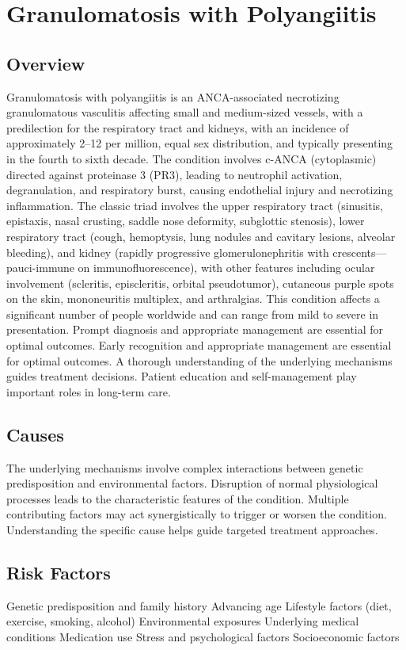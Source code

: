 \chapter{Granulomatosis with Polyangiitis}
\label{sec:Granulomatosis with Polyangiitis (GPA)}

\section{Overview}
Granulomatosis with polyangiitis is an ANCA-associated necrotizing granulomatous vasculitis affecting small and medium-sized vessels, with a predilection for the respiratory tract and kidneys, with an incidence of approximately 2--12 per million, equal sex distribution, and typically presenting in the fourth to sixth decade. The condition involves c-ANCA (cytoplasmic) directed against proteinase 3 (PR3), leading to neutrophil activation, degranulation, and respiratory burst, causing endothelial injury and necrotizing inflammation. The classic triad involves the upper respiratory tract (sinusitis, epistaxis, nasal crusting, saddle nose deformity, subglottic stenosis), lower respiratory tract (cough, hemoptysis, lung nodules and cavitary lesions, alveolar bleeding), and kidney (rapidly progressive glomerulonephritis with crescents---pauci-immune on immunofluorescence), with other features including ocular involvement (scleritis, episcleritis, orbital pseudotumor), cutaneous purple spots on the skin, mononeuritis multiplex, and arthralgias. This condition affects a significant number of people worldwide and can range from mild to severe in presentation. Prompt diagnosis and appropriate management are essential for optimal outcomes. Early recognition and appropriate management are essential for optimal outcomes. A thorough understanding of the underlying mechanisms guides treatment decisions. Patient education and self-management play important roles in long-term care.
\section{Causes}
The underlying mechanisms involve complex interactions between genetic predisposition and environmental factors. Disruption of normal physiological processes leads to the characteristic features of the condition. Multiple contributing factors may act synergistically to trigger or worsen the condition. Understanding the specific cause helps guide targeted treatment approaches.
\section{Risk Factors}
Genetic predisposition and family history Advancing age Lifestyle factors (diet, exercise, smoking, alcohol) Environmental exposures Underlying medical conditions Medication use Stress and psychological factors Socioeconomic factors

